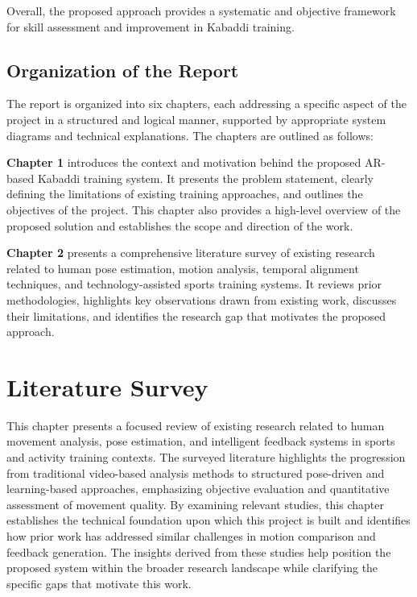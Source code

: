 \documentclass[12pt, a4paper]{report}
\begin{document}
Overall, the proposed approach provides a systematic and objective framework for skill assessment and improvement in Kabaddi training.

\section{Organization of the Report}
The report is organized into six chapters, each addressing a specific aspect of the project in a structured and logical manner, supported by appropriate system diagrams and technical explanations. The chapters are outlined as follows:

\textbf{Chapter 1} introduces the context and motivation behind the proposed AR-based Kabaddi training system. It presents the problem statement, clearly defining the limitations of existing training approaches, and outlines the objectives of the project. This chapter also provides a high-level overview of the proposed solution and establishes the scope and direction of the work.

\textbf{Chapter 2} presents a comprehensive literature survey of existing research related to human pose estimation, motion analysis, temporal alignment techniques, and technology-assisted sports training systems. It reviews prior methodologies, highlights key observations drawn from existing work, discusses their limitations, and identifies the research gap that motivates the proposed approach.

\chapter{Literature Survey}

This chapter presents a focused review of existing research related to human movement analysis, pose estimation, and intelligent feedback systems in sports and activity training contexts. The surveyed literature highlights the progression from traditional video-based analysis methods to structured pose-driven and learning-based approaches, emphasizing objective evaluation and quantitative assessment of movement quality. By examining relevant studies, this chapter establishes the technical foundation upon which this project is built and identifies how prior work has addressed similar challenges in motion comparison and feedback generation. The insights derived from these studies help position the proposed system within the broader research landscape while clarifying the specific gaps that motivate this work.
\end{document}

